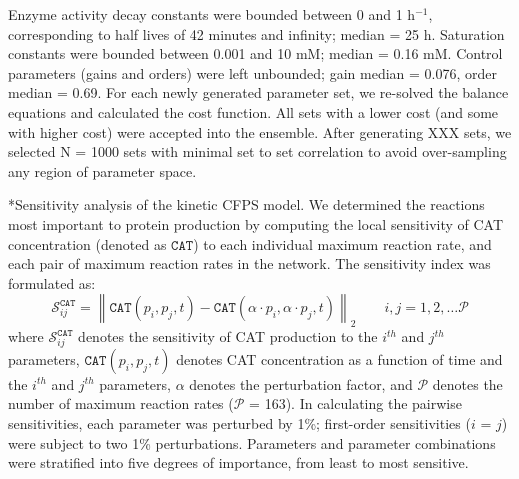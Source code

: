 \documentclass[12pt]{article}
\makeatletter
\renewcommand\subsection{\@startsection
	{subsection}{2}{0mm}
	{-0.05in}
	{-0.5\baselineskip}
	{\normalfont\normalsize\bfseries}}
\newcommand{\norm}[1]{\left\lVert#1\right\rVert}
\makeatother
\begin{document}
Enzyme activity decay constants were bounded between 0 and 1 h$^{-1}$, corresponding to half lives of 42 minutes and infinity; median = 25 h.
Saturation constants were bounded between 0.001 and 10 mM; median = 0.16 mM.
Control parameters (gains and orders) were left unbounded; gain median = 0.076, order median = 0.69.
For each newly generated parameter set, we re-solved the balance equations and calculated the cost function.
All sets with a lower cost (and some with higher cost) were accepted into the ensemble.
After generating XXX sets, we selected N = 1000 sets with minimal set to set correlation to avoid over-sampling any region of parameter space.

\subsection*{Sensitivity analysis of the kinetic CFPS model.}
We determined the reactions most important to protein production by computing the local sensitivity of CAT concentration (denoted as $\texttt{CAT}$) to each individual maximum reaction rate, and each pair of maximum reaction rates in the network.
The sensitivity index was formulated as:
\begin{equation}\label{eqn:CAT-sensitivity}
    \mathcal{S}_{ij}^{\texttt{CAT}} = \norm{\texttt{CAT}(p_i,p_j,t)-\texttt{CAT}(\alpha \cdot p_i,\alpha \cdot p_j,t)}_{2}\qquad{i,j=1,2,\hdots\mathcal{P}}
\end{equation}
where $\mathcal{S}_{ij}^{\texttt{CAT}}$ denotes the sensitivity of CAT production to the $i^{th}$ and $j^{th}$ parameters,
$\texttt{CAT}(p_i,p_j,t)$ denotes CAT concentration as a function of time and the $i^{th}$ and $j^{th}$ parameters,
$\alpha$ denotes the perturbation factor, and $\mathcal{P}$ denotes the number of maximum reaction rates ($\mathcal{P}$ = 163).
In calculating the pairwise sensitivities, each parameter was perturbed by 1\%; first-order sensitivities ($i$ = $j$) were subject to two 1\% perturbations.
Parameters and parameter combinations were stratified into five degrees of importance, from least to most sensitive.
\end{document}

